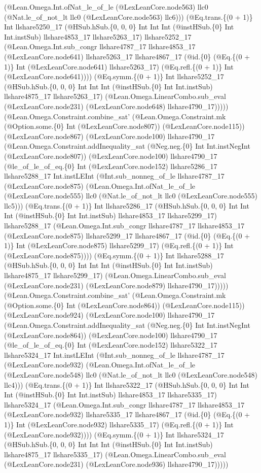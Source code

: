 \documentclass[11pt]{article}
\begin{document}
(@Lean.Omega.Int.ofNat\_le\_of\_le (@LexLeanCore.node563) llc0 (@Nat.le\_of\_not\_lt llc0 (@LexLeanCore.node563) llc6))) (@Eq.trans.\{(0 + 1)\} Int llshare5250\_17 (@HSub.hSub.\{0, 0, 0\} Int Int Int (@instHSub.\{0\} Int Int.instSub) llshare4853\_17 llshare5263\_17) llshare5252\_17 (@Lean.Omega.Int.sub\_congr llshare4787\_17 llshare4853\_17 (@LexLeanCore.node641) llshare5263\_17 llshare4867\_17 (@id.\{0\} (@Eq.\{(0 + 1)\} Int (@LexLeanCore.node641) llshare5263\_17) (@Eq.refl.\{(0 + 1)\} Int (@LexLeanCore.node641)))) (@Eq.symm.\{(0 + 1)\} Int llshare5252\_17 (@HSub.hSub.\{0, 0, 0\} Int Int Int (@instHSub.\{0\} Int Int.instSub) llshare4875\_17 llshare5263\_17) (@Lean.Omega.LinearCombo.sub\_eval (@LexLeanCore.node231) (@LexLeanCore.node648) llshare4790\_17))))) (@Lean.Omega.Constraint.combine\_sat' (@Lean.Omega.Constraint.mk (@Option.some.\{0\} Int (@LexLeanCore.node807)) (@LexLeanCore.node115)) (@LexLeanCore.node867) (@LexLeanCore.node100) llshare4790\_17 (@Lean.Omega.Constraint.addInequality\_sat (@Neg.neg.\{0\} Int Int.instNegInt (@LexLeanCore.node807)) (@LexLeanCore.node100) llshare4790\_17 (@le\_of\_le\_of\_eq.\{0\} Int (@LexLeanCore.node152) llshare5286\_17 llshare5288\_17 Int.instLEInt (@Int.sub\_nonneg\_of\_le llshare4787\_17 (@LexLeanCore.node875) (@Lean.Omega.Int.ofNat\_le\_of\_le (@LexLeanCore.node555) llc0 (@Nat.le\_of\_not\_lt llc0 (@LexLeanCore.node555) llc5))) (@Eq.trans.\{(0 + 1)\} Int llshare5286\_17 (@HSub.hSub.\{0, 0, 0\} Int Int Int (@instHSub.\{0\} Int Int.instSub) llshare4853\_17 llshare5299\_17) llshare5288\_17 (@Lean.Omega.Int.sub\_congr llshare4787\_17 llshare4853\_17 (@LexLeanCore.node875) llshare5299\_17 llshare4867\_17 (@id.\{0\} (@Eq.\{(0 + 1)\} Int (@LexLeanCore.node875) llshare5299\_17) (@Eq.refl.\{(0 + 1)\} Int (@LexLeanCore.node875)))) (@Eq.symm.\{(0 + 1)\} Int llshare5288\_17 (@HSub.hSub.\{0, 0, 0\} Int Int Int (@instHSub.\{0\} Int Int.instSub) llshare4875\_17 llshare5299\_17) (@Lean.Omega.LinearCombo.sub\_eval (@LexLeanCore.node231) (@LexLeanCore.node879) llshare4790\_17))))) (@Lean.Omega.Constraint.combine\_sat' (@Lean.Omega.Constraint.mk (@Option.some.\{0\} Int (@LexLeanCore.node864)) (@LexLeanCore.node115)) (@LexLeanCore.node924) (@LexLeanCore.node100) llshare4790\_17 (@Lean.Omega.Constraint.addInequality\_sat (@Neg.neg.\{0\} Int Int.instNegInt (@LexLeanCore.node864)) (@LexLeanCore.node100) llshare4790\_17 (@le\_of\_le\_of\_eq.\{0\} Int (@LexLeanCore.node152) llshare5322\_17 llshare5324\_17 Int.instLEInt (@Int.sub\_nonneg\_of\_le llshare4787\_17 (@LexLeanCore.node932) (@Lean.Omega.Int.ofNat\_le\_of\_le (@LexLeanCore.node548) llc0 (@Nat.le\_of\_not\_lt llc0 (@LexLeanCore.node548) llc4))) (@Eq.trans.\{(0 + 1)\} Int llshare5322\_17 (@HSub.hSub.\{0, 0, 0\} Int Int Int (@instHSub.\{0\} Int Int.instSub) llshare4853\_17 llshare5335\_17) llshare5324\_17 (@Lean.Omega.Int.sub\_congr llshare4787\_17 llshare4853\_17 (@LexLeanCore.node932) llshare5335\_17 llshare4867\_17 (@id.\{0\} (@Eq.\{(0 + 1)\} Int (@LexLeanCore.node932) llshare5335\_17) (@Eq.refl.\{(0 + 1)\} Int (@LexLeanCore.node932)))) (@Eq.symm.\{(0 + 1)\} Int llshare5324\_17 (@HSub.hSub.\{0, 0, 0\} Int Int Int (@instHSub.\{0\} Int Int.instSub) llshare4875\_17 llshare5335\_17) (@Lean.Omega.LinearCombo.sub\_eval (@LexLeanCore.node231) (@LexLeanCore.node936) llshare4790\_17))))) 
\end{document}
